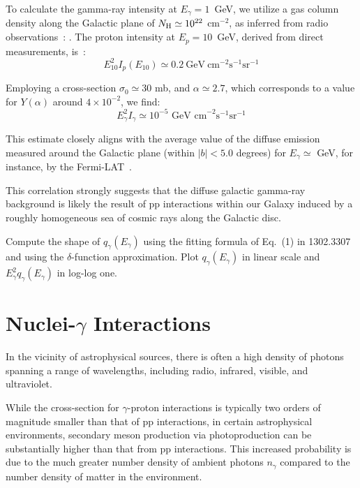 To calculate the gamma-ray intensity at \( E_\gamma = 1\)~GeV, we utilize a gas column density along the Galactic plane of \( N_{\rm H} \simeq 10^{22} \) cm\(^{-2}\), as inferred from radio observations~:
. 
%
The proton intensity at \( E_p = 10\)~GeV, derived from direct measurements, is~:
%
\begin{equation}
E_{10}^2 I_p(E_{10}) \simeq 0.2~\text{GeV}~\text{cm}^{-2} \text{s}^{-1} \text{sr}^{-1}
\end{equation}

Employing a cross-section \( \sigma_0 \simeq 30\) mb, and \( \alpha \simeq 2.7 \), which corresponds to a value for \( Y(\alpha) \) around \( 4 \times 10^{-2} \), we find:
%
\begin{equation}
E_\gamma^2 I_\gamma \simeq 10^{-5} \text{ GeV cm}^{-2} \text{s}^{-1} \text{sr}^{-1}
\end{equation}

This estimate closely aligns with the average value of the diffuse emission measured around the Galactic plane (within \( |b| < 5.0 \) degrees) for \( E_\gamma \simeq \) GeV, for instance, by the Fermi-LAT~.

This correlation strongly suggests that the diffuse galactic gamma-ray background is likely the result of pp interactions within our Galaxy induced by a roughly homogeneous sea of cosmic rays along the Galactic disc.


\begin{problem}
Compute the shape of $q_\gamma(E_\gamma)$ using the fitting formula of Eq.~(1) in 1302.3307 and using the $\delta$-function approximation. Plot $q_\gamma(E_\gamma)$ in linear scale and $E_\gamma^2q_\gamma(E_\gamma)$ in log-log one. 
\end{problem}

\section{Nuclei-$\gamma$ Interactions}

In the vicinity of astrophysical sources, there is often a high density of photons spanning a range of wavelengths, including radio, infrared, visible, and ultraviolet.

While the cross-section for \(\gamma\)-proton interactions is typically two orders of magnitude smaller than that of pp interactions, in certain astrophysical environments, secondary meson production via photoproduction can be substantially higher than that from pp interactions. This increased probability is due to the much greater number density of ambient photons \(n_\gamma\) compared to the number density of matter in the environment.

